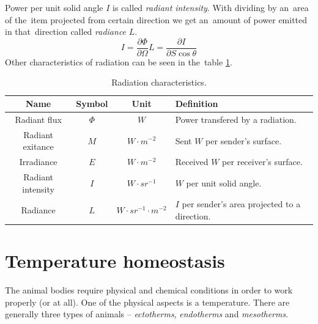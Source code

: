 Power per unit solid angle $I$ is called {\it radiant intensity}. With dividing by an~area of the~item
projected from certain direction we get an~amount of power emitted in that~direction called {\it radiance} $L$.
\begin{subequations}
\begin{equation}
I = \frac{\partial \Phi}{\partial \Omega}
\end{equation}
\begin{equation}
L = \frac{\partial I}{\partial S \cos{\theta}}
\end{equation}
\end{subequations}
Other characteristics of radiation can be seen in the~table \ref{table:units}. \cite{iso800007} \cite{TemperatureMeasuring}

\begin{table}
\begin{tabular}{|c|c|c|l|} \hline
\textbf{Name}             & \textbf{Symbol} & \textbf{Unit}                 & \textbf{Definition}                             \\ \hline
Radiant flux        & $\Phi$          & $W$                           & Power transfered by a radiation.                \\ \hline
Radiant exitance    & $M$             & $W\cdot m^{-2}$               & Sent $W$ per sender's surface.                  \\ \hline 
Irradiance          & $E$             & $W\cdot m^{-2}$               & Received $W$ per receiver's surface.            \\ \hline
Radiant intensity   & $I$             & $W\cdot sr^{-1}$              & $W$ per unit solid angle.                       \\ \hline
Radiance            & $L$             & $W\cdot sr^{-1}\cdot m^{-2}$  & $I$ per sender's area projected to a direction. \\ \hline
\end{tabular}
\caption{Radiation characteristics.\label{table:units} \cite{TemperatureMeasuring}}
\end{table}



\newpage
\section{Temperature homeostasis}
The animal bodies require physical and chemical conditions in order to work properly (or at all). One of
the physical aspects is a temperature. There are generally three types of animals -- {\it ectotherms},
{\it endotherms} and {\it mesotherms}.

